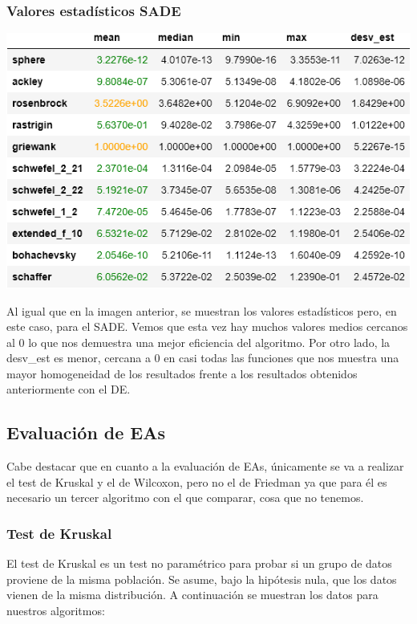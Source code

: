 \documentclass[11pt, a4paper, titlepage]{article}
\begin{document}
\subsubsection{Valores estadísticos SADE}
\vspace{5mm}
\begin{center}
\includegraphics[width=\textwidth]{tableSADE.png}
\end{center}
Al igual que en la imagen anterior, se muestran los valores estadísticos pero, en este caso, para el SADE. Vemos que esta vez hay muchos valores medios cercanos al 0 lo que nos demuestra una mejor eficiencia del algoritmo. Por otro lado, la desv\_est es menor, cercana a 0 en casi todas las funciones que nos muestra una mayor homogeneidad de los resultados frente a los resultados obtenidos anteriormente con el DE.

\newpage

\subsection{Evaluación de EAs}
Cabe destacar que en cuanto a la evaluación de EAs, únicamente se va a realizar el test de Kruskal y el de Wilcoxon, pero no el de Friedman ya que para él es necesario un tercer algoritmo con el que comparar, cosa que no tenemos.
\subsubsection{Test de Kruskal}
\vspace{5mm}
El test de Kruskal es un test no paramétrico para probar si un grupo de datos proviene de la misma población. Se asume, bajo la hipótesis nula, que los datos vienen de la misma distribución. A continuación se muestran los datos para nuestros algoritmos:
\end{document}
